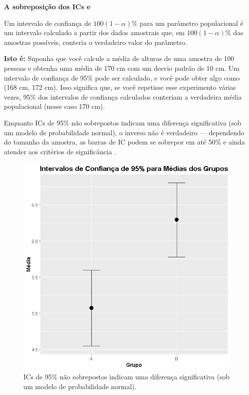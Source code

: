 \documentclass[article]{memoir}
\begin{document}
\begin{tcolorbox}
	\textbf{A sobreposição dos ICs  \cite{cumming2007} e \cite{krzywinski2013}}
	
	Um intervalo de confiança de $100(1 − \alpha)\%$  para um parâmetro populacional é um intervalo calculado a partir dos dados amostrais que, em $100(1 − \alpha)\%$ das amostras possíveis, conteria o verdadeiro valor do parâmetro.
	
	\textbf{Isto é:} Suponha que você calcule a média de alturas de uma amostra de 100 pessoas e obtenha uma média de 170 cm com um desvio padrão de 10 cm. Um intervalo de confiança de 95\% pode ser calculado, e você pode obter algo como (168 cm, 172 cm). Isso significa que, se você repetisse esse experimento várias vezes, 95\% dos intervalos de confiança calculados conteriam a verdadeira média populacional (nesse caso 170 cm).
	
\end{tcolorbox} 



 Enquanto ICs de 95\% não sobrepostos indicam uma diferença significativa (sob um modelo de probabilidade normal), o inverso não é verdadeiro — dependendo do tamanho da amostra, as barras de IC podem se sobrepor em até 50\% e ainda atender aos critérios de significância \cite{cumming2007}.



\begin{figure}[ht]
	\centering
	\includegraphics[width=0.7\linewidth]{figs/IC_sobrep_visual}
	\caption{ICs de 95\% não sobrepostos indicam uma diferença significativa (sob um modelo de probabilidade normal).}
	\label{fig:icsobrepvisual}
\end{figure}
\end{document}
